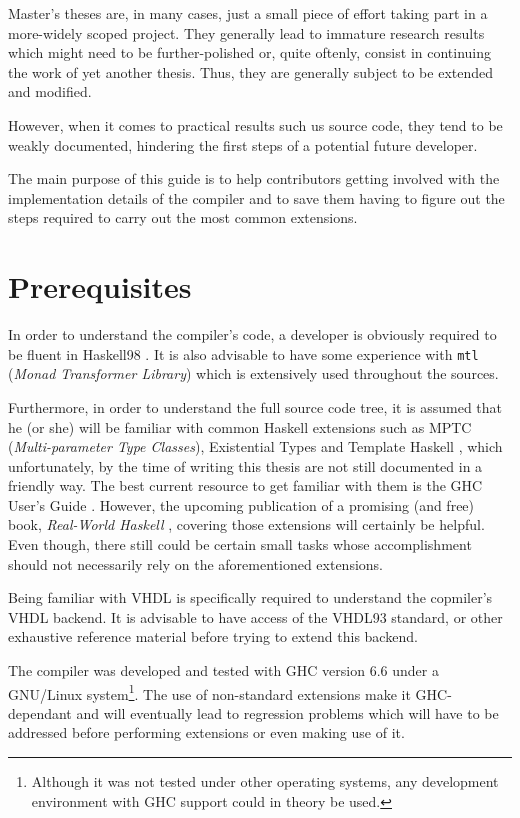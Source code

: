 Master's theses are, in many cases, just a small piece of effort
taking part in a more-widely scoped project. They generally lead to immature
research results which might need to be further-polished or, quite
oftenly, consist in continuing the work of yet another thesis. Thus,
they are generally subject to be extended and modified.

However, when it comes to practical results such us source code, they
tend to be weakly documented, hindering the first steps of a potential
future developer.

The main purpose of this guide is to help contributors getting
involved with the implementation details of the compiler and to save
them having to figure out the steps required to carry out the most
common extensions.
 
\section{Prerequisites}

In order to understand the compiler's code, a developer is obviously
required to be fluent in Haskell98 \cite{haskell}. It is also advisable
to have some experience with \texttt{mtl} (\textit{Monad Transformer
  Library}) which is extensively used throughout the sources.

Furthermore, in order to understand the full source code tree, it is assumed
that he (or she) will be familiar with common Haskell extensions such as
MPTC \cite{fundep} (\textit{Multi-parameter Type Classes}), Existential Types
and Template Haskell \cite{metahaskell}, which unfortunately, by the time of
writing this thesis are not still documented in a friendly way. The best
current resource to get familiar with them is the GHC User's
Guide \cite{ghc:guide}. However, the upcoming publication of a promising (and
free) book, \textit{Real-World Haskell} \cite{realworldhaskell}, covering those
extensions will certainly be helpful. Even though, there still could be
certain small tasks whose accomplishment should not necessarily rely on the
aforementioned extensions.

Being familiar with VHDL is specifically required to understand the
copmiler's VHDL backend. It is advisable to have access of the
VHDL93 \cite{vhdl93} standard, or other exhaustive reference material
before trying to extend this backend.



The compiler was developed and tested with GHC version 6.6 under a
GNU/Linux system\footnote{Although it was not tested under other
  operating systems, any development environment with GHC support
  could in theory be used.}.  The use of non-standard extensions make
it GHC-dependant and will eventually lead to regression problems which
will have to be addressed before performing extensions or even making
use of it.



